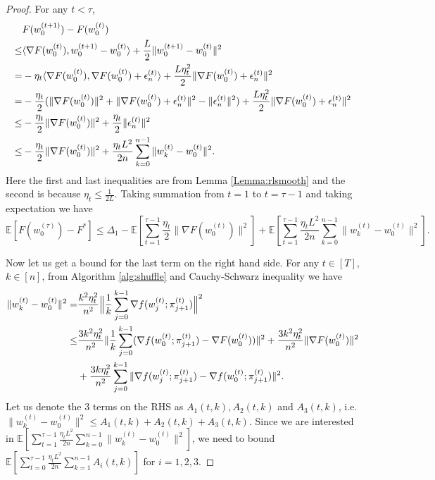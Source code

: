\documentclass{article} %
\theoremstyle{plain}
\theoremstyle{definition}
\theoremstyle{remark}
\begin{document}
\begin{proof}
    For any $t<\tau$,
    \begin{align}
        & F(w^{(t+1)}_0)-F(w^{(t)}_0) \notag \\
        \leq & \langle \nabla F(w^{(t)}_0), w^{(t+1)}_0-w^{(t)}_0\rangle + \frac{L}{2}\|w^{(t+1)}_0-w^{(t)}_0\|^2 \notag \\
        = & -\eta_t\langle \nabla F(w^{(t)}_0), \nabla F(w^{(t)}_0)+\epsilon^{(t)}_n\rangle + \frac{L\eta_t^2}{2}\|\nabla F(w^{(t)}_0)+\epsilon^{(t)}_n\|^2 \notag \\
        = & -\frac{\eta_t}{2}(\|\nabla F(w^{(t)}_0)\|^2+\|\nabla F(w^{(t)}_0)+\epsilon^{(t)}_n\|^2-\|\epsilon^{(t)}_n\|^2)+\frac{L\eta_t^2}{2}\|\nabla F(w^{(t)}_0)+\epsilon^{(t)}_n\|^2 \notag \\
        \leq & -\frac{\eta_t}{2}\|\nabla F(w^{(t)}_0)\|^2+\frac{\eta_t}{2}\|\epsilon^{(t)}_n\|^2 \notag \\
        \leq & -\frac{\eta_t}{2}\|\nabla F(w^{(t)}_0)\|^2+\frac{\eta_t L^2}{2n}\sum_{k=0}^{n-1} \|w^{(t)}_k-w^{(t)}_0\|^2. \label{ineq:deltaF}
    \end{align}
    Here the first and last inequalities are from Lemma \ref{Lemma:rlsmooth} and the second is because $\eta_t\leq\frac{1}{2L}$. Taking summation from $t=1$ to $t=\tau-1$ and taking expectation we have
    \begin{equation}
    \mathbb{E}[F(w^{(\tau)}_0)-F^*]\leq \Delta_1-\mathbb{E}[\sum_{t=1}^{\tau-1}\frac{\eta_t}{2}\|\nabla F(w^{(t)}_0)\|^2]+\mathbb{E}[\sum_{t=1}^{\tau-1}\frac{\eta_t L^2}{2n}\sum_{k=0}^{n-1}\|w^{(t)}_k-w^{(t)}_0\|^2]. \label{ineq:F}
    \end{equation}

Now let us get a bound for the last term on the right hand side. For any $t\in[T]$, $k\in[n]$, from Algorithm \ref{alg:shuffle} and Cauchy-Schwarz inequality we have 
\begin{align}
    \|w^{(t)}_k-w^{(t)}_0\|^2 = &\frac{k^2\eta_t^2}{n^2}\Big\|\frac{1}{k}\sum_{j=0}^{k-1} \nabla f(w^{(t)}_j;\pi^{(t)}_{j+1})\Big\|^2 \notag \\
    \leq & \frac{3k^2\eta_t^2}{n^2}\|\frac{1}{k}\sum_{j=0}^{k-1}(\nabla f(w^{(t)}_0;\pi^{(t)}_{j+1})-\nabla F(w^{(t)}_0))\|^2+\frac{3k^2\eta_t^2}{n^2}\|\nabla F(w^{(t)}_0)\|^2 \notag \\
    & +\frac{3k\eta_t^2}{n^2}\sum_{j=0}^{k-1}\|\nabla f(w^{(t)}_j;\pi^{(t)}_{j+1})-\nabla f(w^{(t)}_0;\pi^{(t)}_{j+1})\|^2. \notag
\end{align}
    Let us denote the 3 terms on the RHS as $A_1(t, k), A_2(t, k)$ and $A_3(t, k)$, i.e. $\|w^{(t)}_k-w^{(t)}_0\|^2\leq A_1(t,k)+A_2(t,k)+A_3(t,k)$. Since we are interested in $\mathbb{E}[\sum_{t=1}^{\tau-1}\frac{\eta_t L^2}{2n}\sum_{k=0}^{n-1}\|w^{(t)}_k-w^{(t)}_0\|^2]$, we need to bound $\mathbb{E}[\sum_{t=0}^{\tau-1}\frac{\eta_t L^2}{2n}\sum_{k=1}^{n-1}A_i(t, k)]$ for $i=1,2,3.$


\end{proof}
\end{document}
